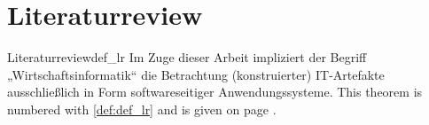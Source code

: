 \section{Literaturreview}

\begin{mydef}{Literaturreview}{def_lr}
  Im Zuge dieser Arbeit impliziert der Begriff „Wirtschaftsinformatik“ die Betrachtung (konstruierter) IT-Artefakte ausschließlich in Form softwareseitiger Anwendungssysteme.
  This theorem is numbered with  \ref{def:def_lr} and is given on page \pageref{def:def_lr}.
\end{mydef}
